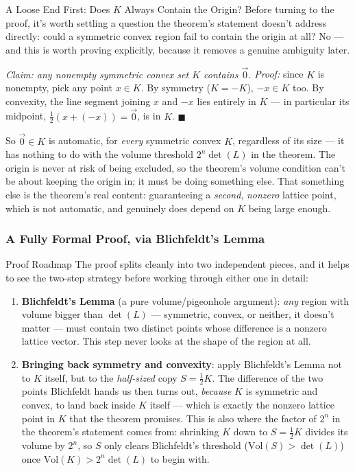 \begin{rmkbox}{A Loose End First: Does $K$ Always Contain the Origin?}
Before turning to the proof, it's worth settling a question the theorem's statement doesn't address directly: could a symmetric convex region fail to contain the origin at all? No --- and this is worth proving explicitly, because it removes a genuine ambiguity later.

\emph{Claim: any nonempty symmetric convex set $K$ contains $\vec 0$.} \emph{Proof:} since $K$ is nonempty, pick any point $x \in K$. By symmetry ($K=-K$), $-x \in K$ too. By convexity, the line segment joining $x$ and $-x$ lies entirely in $K$ --- in particular its midpoint, $\tfrac{1}{2}(x + (-x)) = \vec 0$, is in $K$. $\blacksquare$

So $\vec 0 \in K$ is automatic, for \emph{every} symmetric convex $K$, regardless of its size --- it has nothing to do with the volume threshold $2^n\det(L)$ in the theorem. The origin is never at risk of being excluded, so the theorem's volume condition can't be about keeping the origin in; it must be doing something else. That something else is the theorem's real content: guaranteeing a \emph{second}, \emph{nonzero} lattice point, which is not automatic, and genuinely does depend on $K$ being large enough.
\end{rmkbox}

\subsubsection{A Fully Formal Proof, via Blichfeldt's Lemma}
\label{sec:L1:a-fully-formal-proof-via-blichfeldt-s-le}

\begin{rmkbox}{Proof Roadmap}
The proof splits cleanly into two independent pieces, and it helps to see the two-step strategy before working through either one in detail:
\begin{enumerate}[leftmargin=*]
  \item \textbf{Blichfeldt's Lemma} (a pure volume/pigeonhole argument): \emph{any} region with volume bigger than $\det(L)$ --- symmetric, convex, or neither, it doesn't matter --- must contain two distinct points whose difference is a nonzero lattice vector. This step never looks at the shape of the region at all.
  \item \textbf{Bringing back symmetry and convexity}: apply Blichfeldt's Lemma not to $K$ itself, but to the \emph{half-sized} copy $S = \tfrac12 K$. The difference of the two points Blichfeldt hands us then turns out, \emph{because} $K$ is symmetric and convex, to land back inside $K$ itself --- which is exactly the nonzero lattice point in $K$ that the theorem promises. This is also where the factor of $2^n$ in the theorem's statement comes from: shrinking $K$ down to $S=\tfrac12K$ divides its volume by $2^n$, so $S$ only clears Blichfeldt's threshold ($\mathrm{Vol}(S) > \det(L)$) once $\mathrm{Vol}(K) > 2^n\det(L)$ to begin with.
\end{enumerate}
\end{rmkbox}

